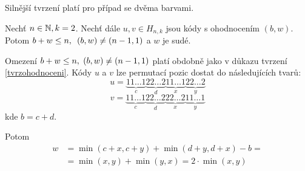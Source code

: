 Silnější tvrzení platí pro případ se dvěma barvami. 

\begin{tvrz}\label{tvrzohodnoceni2}
    Nechť $n \in \mathbb{N}, k=2$. Nechť dále $u, v \in H_{n,k}$ jsou kódy s ohodnocením $(b,w)$. Potom $b + w \leq n, \hspace{5px} (b,w) \neq (n-1,1)$ a $w$ je sudé.
\end{tvrz}
\begin{dukaz}
Omezení $b + w \leq n, \hspace{3px} (b,w) \neq (n-1,1)$ platí obdobně jako v důkazu tvrzení \ref{tvrzohodnoceni}. Kódy $u$ a $v$ lze permutací pozic dostat do následujících tvarů:
    \[
  u = 
    \underbrace{11\dots1}_{c}
    \underbrace{22\dots2}_{d}
    \underbrace{11\dots1}_{x}
    \underbrace{22\dots2}_{y}
 \]
 \[
  v = 
    \underbrace{11\dots1}_{c}
    \underbrace{22\dots2}_{d}
    \underbrace{22\dots2}_{x}
    \underbrace{11\dots1}_{y}
 \]
 kde $b = c + d$. 

 Potom
 \begin{align*}
     w &= \min(c + x, c + y) + \min(d + y, d + x) - b =\\
     &= \min(x, y) + \min(y, x) = 2\cdot \min(x, y)
 \end{align*}

\end{dukaz}

    






